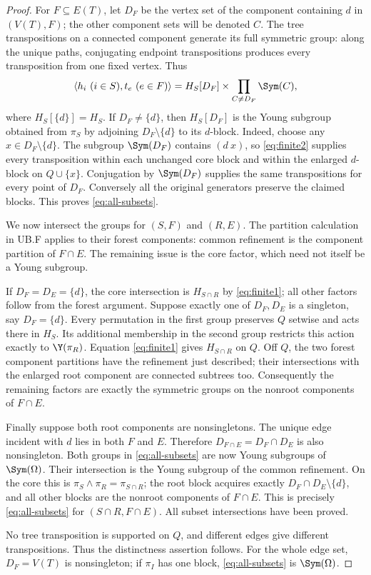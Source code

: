 \begin{proof}
For $F\subseteq E(T)$, let $D_F$ be the vertex set of the component
containing $d$ in $(V(T),F)$; the other component sets will be denoted
$C$. The tree transpositions on a connected component generate its full
symmetric group: along the unique paths, conjugating endpoint
transpositions produces every transposition from one fixed vertex.
Thus
\begin{equation}\label{eq:all-subsets}
\langle h_i\ (i\in S),t_e\ (e\in F)\rangle
= H_S[D_F]\times\prod_{C\ne D_F}\Sym(C),
\end{equation}
where $H_S[\{d\}]=H_S$. If $D_F\ne\{d\}$, then $H_S[D_F]$
is the Young subgroup obtained from $\pi_S$ by adjoining
$D_F\setminus\{d\}$ to its $d$-block. Indeed, choose any
$x\in D_F\setminus\{d\}$. The subgroup $\Sym(D_F)$ contains
$(d\ x)$, so \eqref{eq:finite2} supplies every transposition within
each unchanged core block and within the enlarged $d$-block on
$Q\cup\{x\}$. Conjugation by $\Sym(D_F)$ supplies the same
transpositions for every point of $D_F$. Conversely all the original
generators preserve the claimed blocks. This proves \eqref{eq:all-subsets}.

We now intersect the groups for $(S,F)$ and $(R,E)$. The partition calculation in UB.F applies to their forest components:
common refinement is the component partition of $F\cap E$.
The remaining issue is the core factor, which need not itself be a Young subgroup.

If $D_F=D_E=\{d\}$, the core intersection is $H_{S\cap R}$
by \eqref{eq:finite1}; all other factors follow from the forest
argument. Suppose exactly one of $D_F,D_E$ is a singleton, say
$D_F=\{d\}$. Every permutation in the first group preserves $Q$
setwise and acts there in $H_S$. Its additional membership in the
second group restricts this action exactly to $\Y(\pi_R)$.
Equation \eqref{eq:finite1} gives $H_{S\cap R}$ on $Q$.
Off $Q$, the two forest component partitions have the refinement
just described; their intersections with the enlarged root component
are connected subtrees too. Consequently the remaining factors are
exactly the symmetric groups on the nonroot components of $F\cap E$.

Finally suppose both root components are nonsingletons. The unique
edge incident with $d$ lies in both $F$ and $E$. Therefore
$D_{F\cap E}=D_F\cap D_E$ is also nonsingleton. Both groups in
\eqref{eq:all-subsets} are now Young subgroups of $\Sym(\Omega)$.
Their intersection is the Young subgroup of the common refinement.
On the core this is $\pi_S\wedge\pi_R=\pi_{S\cap R}$;
the root block acquires exactly $D_F\cap D_E\setminus\{d\}$,
and all other blocks are the nonroot components of $F\cap E$.
This is precisely \eqref{eq:all-subsets} for $(S\cap R,F\cap E)$.
All subset intersections have been proved.

No tree transposition is supported on $Q$, and different edges give
different transpositions. Thus the distinctness assertion follows.
For the whole edge set, $D_F=V(T)$ is nonsingleton; if $\pi_I$
has one block, \eqref{eq:all-subsets} is $\Sym(\Omega)$.
\end{proof}

